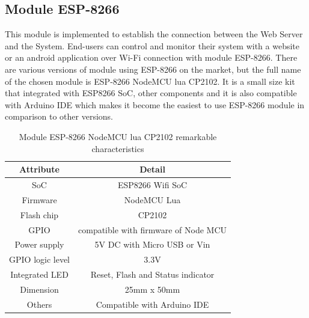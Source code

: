       \subsection{Module ESP-8266}
      This module is implemented to establish the connection between the Web Server and the System. End-users can control and monitor their system with a website or an android application over Wi-Fi connection with module ESP-8266. There are various versions of module using ESP-8266 on the market, but the full name of the chosen module is ESP-8266 NodeMCU lua CP2102. It is a small size kit that integrated with ESP8266 SoC, other components and it is also compatible with Arduino IDE which makes it become the easiest to use ESP-8266 module in comparison to other versions.
      \begin{table}[h!]
        \begin{center}
        \begin{tabular}{ |c|c|  }
          \hline
          Attribute & Detail\\
          \hline
          SoC& ESP8266 Wifi SoC\\
          \hline
          Firmware&   NodeMCU Lua\\
          \hline
          Flash chip &CP2102\\
          \hline
          GPIO & compatible with firmware of Node MCU\\
          \hline
          Power supply & 5V DC with Micro USB or Vin\\
          \hline
          GPIO logic level & 3.3V\\
          \hline
          Integrated LED & Reset, Flash and Status indicator\\
          \hline
          Dimension & 25mm x 50mm\\
          \hline
          Others& Compatible with Arduino IDE\\
          \hline
         \end{tabular}
         \caption{Module ESP-8266 NodeMCU lua CP2102 remarkable characteristics}
         \label{table:moduleEspDetail}
        \end{center}
        \end{table}

